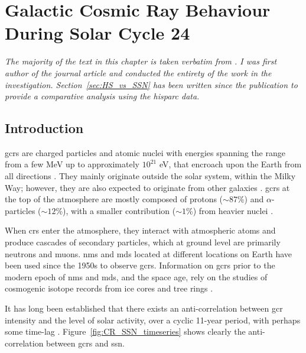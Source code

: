\chapter{Galactic Cosmic Ray Behaviour During Solar Cycle 24}\label{chap:GCR_SSN_24}


\textit{The majority of the text in this chapter is taken verbatim from \cite{ross_behaviour_2019}. I was first author of the journal article and conducted the entirety of the work in the investigation. Section~\ref{sec:HS_vs_SSN} has been written since the publication to provide a comparative analysis using the \gls{hisparc} data.}%


\section{Introduction}
\label{S-Introduction} 

\glspl{gcr} are charged particles and atomic nuclei with energies spanning the range from a few MeV up to approximately $10^{21}$ eV, that encroach upon the Earth from all directions  \citep{giacalone_energetic_2010}. They mainly originate outside the solar system, within the Milky Way; however, they are also expected to originate from other galaxies \citep{aab_observation_2017}. \glspl{gcr} at the top of the atmosphere are mostly composed of protons ($\sim87$\%) and $\alpha$-particles ($\sim12$\%), with a smaller contribution ($\sim1$\%) from heavier nuclei \citep{dunai_cosmic_2010}.

When \glspl{cr} enter the atmosphere, they interact with atmospheric atoms and produce cascades of secondary particles, which at ground level are primarily neutrons and muons. \glspl{nm} and \glspl{md} located at different locations on Earth have been used since the 1950s to observe \glspl{gcr}. Information on \glspl{gcr} prior to the modern epoch of \glspl{nm} and \glspl{md}, and the space age, rely on the studies of cosmogenic isotope records from ice cores and tree rings \citep{owens_heliospheric_2013}.

It has long been established that there exists an anti-correlation between \gls{gcr} intensity and the level of solar activity, over a cyclic 11-year period, with perhaps some time-lag  \citep{forbush_cosmic-ray_1958, parker_passage_1965, usoskin_correlative_1998, van_allen_modulation_2000}. Figure~\ref{fig:CR_SSN_timeseries} shows clearly the anti-correlation between \glspl{gcr} and \gls{ssn}.


